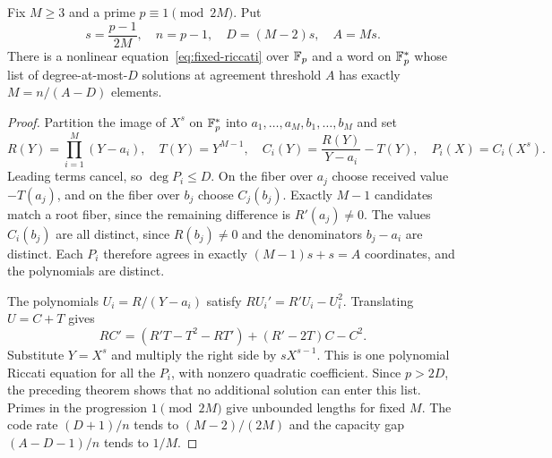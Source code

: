 \begin{proposition}
\label{prop:riccati-sharp-list}
Fix $M\ge3$ and a prime $p\equiv1\pmod{2M}$. Put
\[
 s=\frac{p-1}{2M},\quad n=p-1,\quad D=(M-2)s,\quad A=Ms.
\]
There is a nonlinear equation~\eqref{eq:fixed-riccati} over $\mathbb F_p$
and a word on $\mathbb F_p^*$ whose list of degree-at-most-$D$ solutions
at agreement threshold $A$ has exactly $M=n/(A-D)$ elements.
\end{proposition}
\begin{proof}
Partition the image of $X^s$ on $\mathbb F_p^*$ into
$a_1,\ldots,a_M,b_1,\ldots,b_M$ and set
\[
 R(Y)=\prod_{i=1}^M(Y-a_i),\quad T(Y)=Y^{M-1},\quad
 C_i(Y)=\frac{R(Y)}{Y-a_i}-T(Y),\quad P_i(X)=C_i(X^s).
\]
Leading terms cancel, so $\deg P_i\le D$. On the fiber over $a_j$
choose received value $-T(a_j)$, and on the fiber over $b_j$ choose
$C_j(b_j)$. Exactly $M-1$ candidates match a root fiber, since the
remaining difference is $R'(a_j)\ne0$. The values $C_i(b_j)$ are all
distinct, since $R(b_j)\ne0$ and the denominators $b_j-a_i$ are
distinct. Each $P_i$ therefore agrees in exactly $(M-1)s+s=A$
coordinates, and the polynomials are distinct.

The polynomials $U_i=R/(Y-a_i)$ satisfy $RU_i'=R'U_i-U_i^2$.
Translating $U=C+T$ gives
\[
 RC'=(R'T-T^2-RT')+(R'-2T)C-C^2.
\]
Substitute $Y=X^s$ and multiply the right side by $sX^{s-1}$.
This is one polynomial Riccati equation for all the $P_i$, with
nonzero quadratic coefficient. Since $p>2D$, the preceding theorem
shows that no additional solution can enter this list. Primes in
the progression $1\pmod{2M}$ give unbounded lengths for fixed $M$.
The code rate $(D+1)/n$ tends to $(M-2)/(2M)$ and the capacity gap
$(A-D-1)/n$ tends to $1/M$.
\end{proof}

